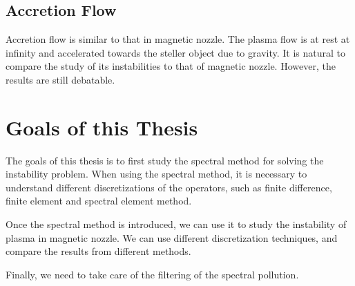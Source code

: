 \subsection{Accretion Flow}
Accretion flow is similar to that in magnetic nozzle. The plasma flow is at rest at infinity and accelerated towards the steller object due to gravity. It is natural to compare the study of its instabilities to that of magnetic nozzle. However, the results are still debatable. \cite{keto_stability_2020,aikawa_stability_1979,stellingwerf_stability_1978}


\section{Goals of this Thesis}
The goals of this thesis is to first study the spectral method for solving the instability problem. When using the spectral method, it is necessary to understand different discretizations of the operators, such as finite difference, finite element and spectral element method.

Once the spectral method is introduced, we can use it to study the instability of plasma in magnetic nozzle. We can use different discretization techniques, and compare the results from different methods.

Finally, we need to take care of the filtering of the spectral pollution.



